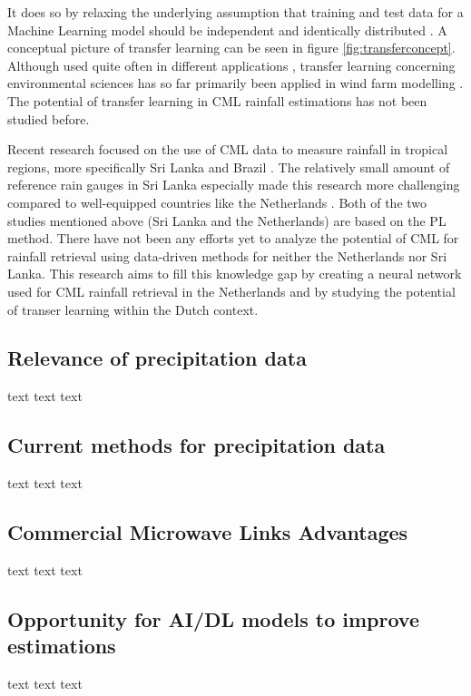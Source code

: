 \documentclass[twocolumn, 10pt, a4paper]{memoir}
\begin{document}
It does so by relaxing the underlying assumption that training and test data for a Machine Learning model should be independent and identically distributed \cite{Weiss2016}. A conceptual picture of transfer learning can be seen in figure \ref{fig:transferconcept}. Although used quite often in different applications \cite{Zhuang2021}, transfer learning concerning environmental sciences has so far primarily been applied in wind farm modelling . The potential of transfer learning in CML rainfall estimations has not been studied before. 

Recent research focused on the use of CML data to measure rainfall in tropical regions, more specifically Sri Lanka  and Brazil . The relatively small amount of reference rain gauges in Sri Lanka especially made this research more challenging compared to well-equipped countries like the Netherlands . Both of the two studies mentioned above (Sri Lanka and the Netherlands) are based on the PL method. There have not been any efforts yet to analyze the potential of CML for rainfall retrieval using data-driven methods for neither the Netherlands nor Sri Lanka. This research aims to fill this knowledge gap by creating a neural network used for CML rainfall retrieval in the Netherlands and by studying the potential of transer learning within the Dutch context.
 \subsection{Relevance of precipitation data}
 text text text
 \subsection{Current methods for precipitation data}
 text text text
 \subsection{Commercial Microwave Links Advantages}
 text text text
 \subsection{Opportunity for AI/DL models to improve estimations}
 text text text
\end{document}
